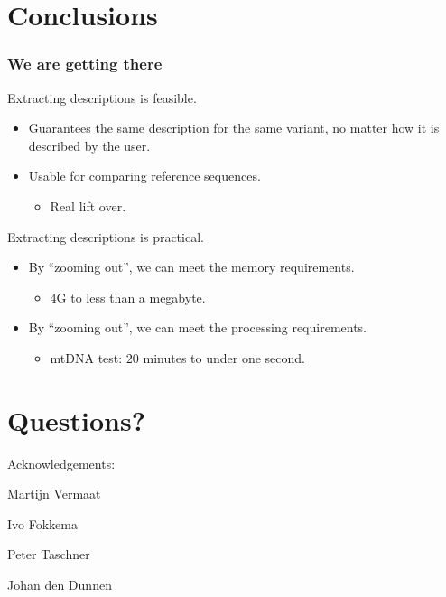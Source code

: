 \documentclass[slidestop]{beamer}
\begin{document}
\section{Conclusions}
\begin{frame}
  \frametitle{We are getting there}

  Extracting descriptions is feasible.
  \pause
  \begin{itemize}
    \item Guarantees the same description for the same variant, no matter how
      it is described by the user.
    \item Usable for comparing reference sequences.
    \pause
    \begin{itemize}
      \item Real lift over.
    \end{itemize}
  \end{itemize}
  \bigskip
  \pause

  Extracting descriptions is practical.
  \begin{itemize}
    \item By ``zooming out'', we can meet the memory requirements.
    \begin{itemize}
      \item $4$G to less than a megabyte.
    \end{itemize}
    \item By ``zooming out'', we can meet the processing requirements.
    \begin{itemize}
      \item mtDNA test: $20$ minutes to under one second.
    \end{itemize}
  \end{itemize}
\end{frame}

\section{Questions?}
\lastpagetemplate
\begin{frame}
  \begin{center}
    Acknowledgements:
    \bigskip
    \bigskip

    Martijn Vermaat

    Ivo Fokkema

    Peter Taschner

    Johan den Dunnen

  \end{center}
\end{frame}
\end{document}
